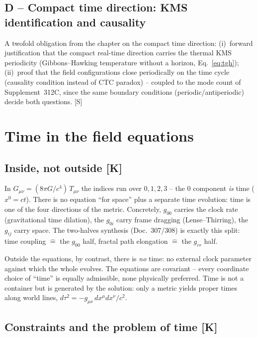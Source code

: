\documentclass[11pt]{report}
\begin{document}
\section{D -- Compact time direction: KMS identification and
causality}

A twofold obligation from the chapter on the compact time
direction: (i)~forward justification that the compact real-time
direction carries the thermal KMS periodicity (Gibbons--Hawking
temperature without a horizon, Eq.~\eqref{eq:tgh});
(ii)~proof that the field configurations close periodically on the
time cycle (causality condition instead of CTC paradox) -- coupled
to the mode count of Supplement~312C, since the same boundary
conditions (periodic/antiperiodic) decide both questions. [S]

\chapter{Time in the field equations}

\section{Inside, not outside [K]}

In $G_{\mu\nu} = (8\pi G/c^4)\,T_{\mu\nu}$ the indices run over
$0,1,2,3$ -- the $0$ component \emph{is} time ($x^0 = ct$). There is
no equation \enquote{for space} plus a separate time evolution:
time is one of the four directions of the metric. Concretely,
$g_{00}$ carries the clock rate (gravitational time dilation), the
$g_{0i}$ carry frame dragging (Lense--Thirring), the $g_{ij}$ carry
space. The two-halves synthesis (Doc.~307/308) is exactly this
split: time coupling $\hat{=}$ the $g_{00}$ half, fractal path
elongation $\hat{=}$ the $g_{rr}$ half.

Outside the equations, by contrast, there is \emph{no} time: no
external clock parameter against which the whole evolves. The
equations are covariant -- every coordinate choice of
\enquote{time} is equally admissible, none physically preferred.
Time is not a container but is generated by the solution: only a
metric yields proper times along world lines,
$d\tau^2 = -g_{\mu\nu}\,dx^\mu dx^\nu/c^2$.

\section{Constraints and the problem of time [K]}
\end{document}
